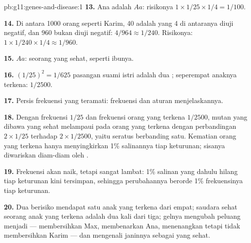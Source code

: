 \begin{solution}{pb:g11:genes-and-disease:1}
\textbf{13.} Ana adalah $Aa$: risikonya $1 \times 1/25 \times 1/4 = 1/100$.

\textbf{14.} Di antara 1000 orang seperti Karim, 40 adalah  yang
4 di antaranya diuji negatif, dan 960 bukan  diuji negatif: $4/964 \approx
1/240$. Risikonya: $1 \times 1/240 \times 1/4 \approx 1/960$.

\textbf{15.} $Aa$: seorang  yang sehat, seperti ibunya.

\textbf{16.} $(1/25)^2 = 1/625$ pasangan suami istri adalah dua
; seperempat anaknya terkena: $1/2500$.

\textbf{17.} Persis frekuensi yang teramati: frekuensi  dan
aturan  menjelaskannya.

\textbf{18.} Dengan frekuensi  $1/25$ dan frekuensi orang yang
terkena $1/2500$,  mutan yang dibawa  yang sehat melampaui
 pada orang yang terkena dengan perbandingan $2 \times 1/25$
terhadap $2 \times
1/2500$, yaitu seratus berbanding satu. Kematian
orang yang terkena hanya menyingkirkan 1\% salinannya tiap keturunan;
sisanya diwariskan diam-diam oleh .

\textbf{19.} Frekuensi  akan naik, tetapi sangat lambat: 1\%
salinan yang dahulu hilang tiap keturunan kini tersimpan, sehingga
perubahannya berorde 1\% frekuensinya tiap keturunan.

\textbf{20.} Dua  berisiko mendapat satu anak yang terkena dari
empat; saudara sehat seorang anak yang terkena adalah  dua kali
dari tiga; gelnya mengubah peluang menjadi  --- membersihkan
Max, membenarkan Ana, menenangkan tetapi tidak membersihkan Karim ---
dan mengenali janinnya sebagai  yang sehat.
\end{solution}
